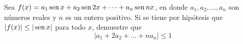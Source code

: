 \item Sea $f(x) = a_1 \operatorname{sen} x + a_2 \operatorname{sen} 2x + \dots + a_n \operatorname{sen} nx$, en donde $a_1, a_2, \dots, a_n$ son números reales y $n$ es un entero positivo. Si se tiene por hipótesis que $|f(x)| \le |\operatorname{sen} x|$ para todo $x$, demuestre que
    \[ |a_1 + 2a_2 + \dots + n a_n| \le 1 \]
